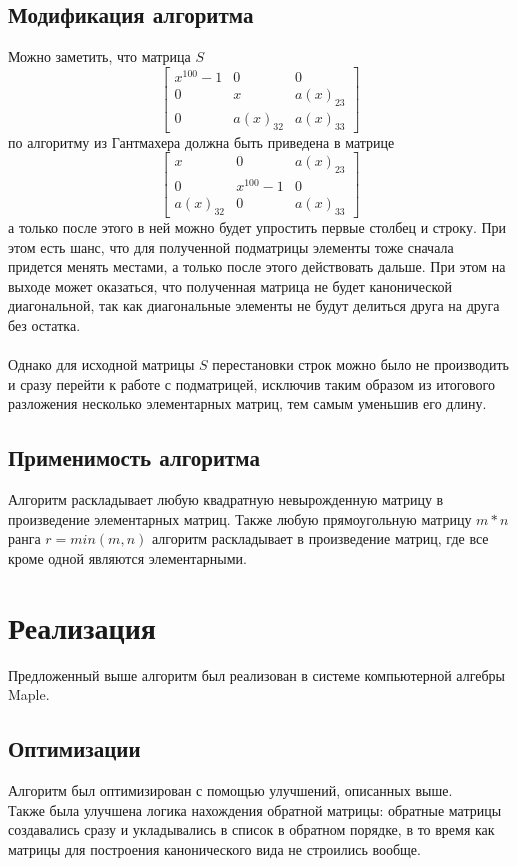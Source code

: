 \documentclass[14pt, a4paper]{extreport}
\begin{document}
		\section{Модификация алгоритма}
		Можно заметить, что матрица $S$
		\[
		\begin{bmatrix}
			x^{100} - 1 & 0 & 0 \\
			0 & x & a(x)_{23} \\
			0 & a(x)_{32} & a(x)_{33}
		\end{bmatrix}
		\]
		по алгоритму из Гантмахера должна быть приведена в матрице
		\[
		\begin{bmatrix}
			x & 0 & a(x)_{23} \\
			0 & x^{100} - 1 & 0 \\
			a(x)_{32} & 0 & a(x)_{33}
		\end{bmatrix}
		\]
		а только после этого в ней можно будет упростить первые столбец и строку. При
		этом есть шанс, что для полученной подматрицы элементы тоже сначала придется
		менять местами, а только после этого действовать дальше. При этом на выходе
		может оказаться, что полученная матрица не будет канонической диагональной, так
		как диагональные элементы не будут делиться друга на друга без остатка.\\\\
		Однако для исходной матрицы $S$ перестановки строк можно было не производить
		и сразу перейти к работе с подматрицей, исключив таким образом из итогового
		разложения несколько элементарных матриц, тем самым уменьшив его длину.
		\section{Применимость алгоритма}
			Алгоритм раскладывает любую квадратную невырожденную матрицу в произведение
			элементарных матриц. Также любую прямоугольную матрицу $m*n$ ранга $r=min(m,n)$
			алгоритм раскладывает в произведение матриц, где все кроме одной являются
			элементарными.
	\chapter{Реализация}
		Предложенный выше алгоритм был реализован в системе компьютерной алгебры Maple.
		\section{Оптимизации}
		Алгоритм был оптимизирован с помощью улучшений, описанных выше.\\
		Также была улучшена логика нахождения обратной матрицы: обратные матрицы
		создавались сразу и укладывались в список в обратном порядке, в то время как
		матрицы для построения канонического вида не строились вообще.
\end{document}
